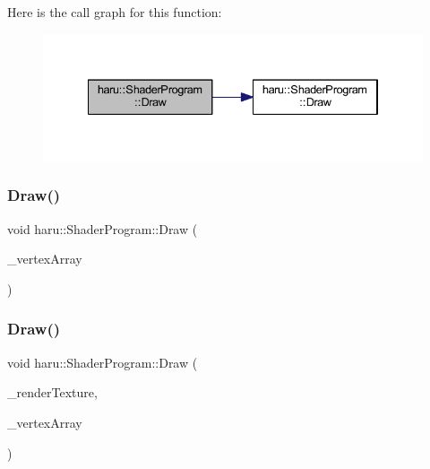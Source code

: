 Here is the call graph for this function\+:
\nopagebreak
\begin{figure}[H]
\begin{center}
\leavevmode
\includegraphics[width=334pt]{classharu_1_1_shader_program_a6e322ac38c9358486ccee3c06aef4de1_cgraph}
\end{center}
\end{figure}
\mbox{\label{classharu_1_1_shader_program_af76596f322a345e67ad8ee1395cc76c4}} 
\subsubsection{\texorpdfstring{Draw()}{Draw()}\hspace{0.1cm}{\footnotesize\ttfamily [3/4]}}
{\footnotesize\ttfamily void haru\+::\+Shader\+Program\+::\+Draw (\begin{DoxyParamCaption}\item[{std\+::shared\+\_\+ptr$<$ \mbox{\hyperlink{classharu_1_1_vertex_array}{Vertex\+Array}} $>$}]{\+\_\+vertex\+Array }\end{DoxyParamCaption})}

\mbox{\label{classharu_1_1_shader_program_af06e97b4b8eec4d8fd197f58df319206}} 
\subsubsection{\texorpdfstring{Draw()}{Draw()}\hspace{0.1cm}{\footnotesize\ttfamily [4/4]}}
{\footnotesize\ttfamily void haru\+::\+Shader\+Program\+::\+Draw (\begin{DoxyParamCaption}\item[{std\+::shared\+\_\+ptr$<$ \mbox{\hyperlink{classharu_1_1_render_texture}{Render\+Texture}} $>$}]{\+\_\+render\+Texture,  }\item[{std\+::shared\+\_\+ptr$<$ \mbox{\hyperlink{classharu_1_1_vertex_array}{Vertex\+Array}} $>$}]{\+\_\+vertex\+Array }\end{DoxyParamCaption})}

